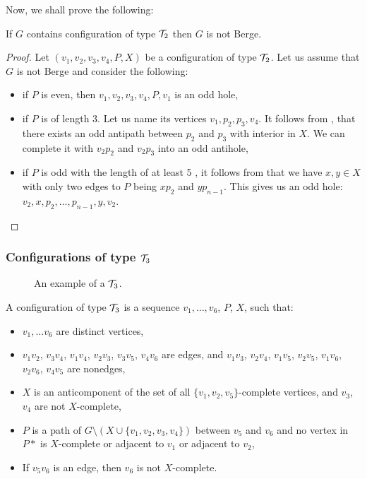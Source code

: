 Now, we shall prove the following:

\begin{theorem}
	If $G$ contains configuration of type $\mathcal{T}_2$ then $G$ is not Berge.
\end{theorem}
\begin{proof}
	Let $(v_1, v_2, v_3, v_4, P, X)$ be a configuration of type $\mathcal{T}_2$. Let us assume that $G$ is not Berge and consider the following:
	\begin{itemize}
		\item if $P$ is even, then $v_1, v_2, v_3, v_4, P, v_1$ is an odd hole,
		\item if $P$ is of length 3.  Let us name its vertices $v_1, p_2, p_3, v_4$. It follows from , that there exists an odd antipath between $p_2$ and $p_3$ with interior in $X$. We can complete it with $v_2p_2$ and $v_2p_3$ into an odd antihole,
		\item if $P$ is odd with the length of at least 5 , it follows from  that we have $x, y \in X$ with only two edges to $P$ being $xp_2$ and $yp_{n-1}$. This gives us an odd hole: $v_2, x, p_2, \ldots, p_{n-1}, y, v_2$.
	\end{itemize}
\end{proof}

\subsubsection{Configurations of type $\mathcal{T}_3$}

\begin{wrapfigure}{r}{0.35\textwidth}
	
	\caption{An example of a $\mathcal{T}_3$.}%
	\vspace{-1.5cm}
\end{wrapfigure}

A configuration of type $\mathcal{T}_3$ is a sequence $v_1, \ldots, v_6$, $P$, $X$, such that:
\begin{itemize}
	\item $v_1, \ldots v_6$ are distinct vertices,
	\item $v_1v_2$, $v_3v_4$, $v_1v_4$, $v_2v_3$, $v_3v_5$, $v_4v_6$ are edges, and $v_1v_3$, $v_2v_4$, $v_1v_5$, $v_2v_5$, $v_1v_6$, $v_2v_6$, $v_4v_5$ are nonedges,
	\item $X$ is an anticomponent of the set of all $\{v_1, v_2, v_5\}$-complete vertices, and $v_3$, $v_4$ are not $X$-complete,
	\item $P$ is a path of $G \setminus ( X \cup \{v_1, v_2, v_3, v_4\} )$ between $v_5$ and $v_6$ and no vertex in $P*$ is $X$-complete or adjacent to $v_1$ or adjacent to $v_2$,
	\item If $v_5v_6$ is an edge, then $v_6$ is not $X$-complete.
\end{itemize}

